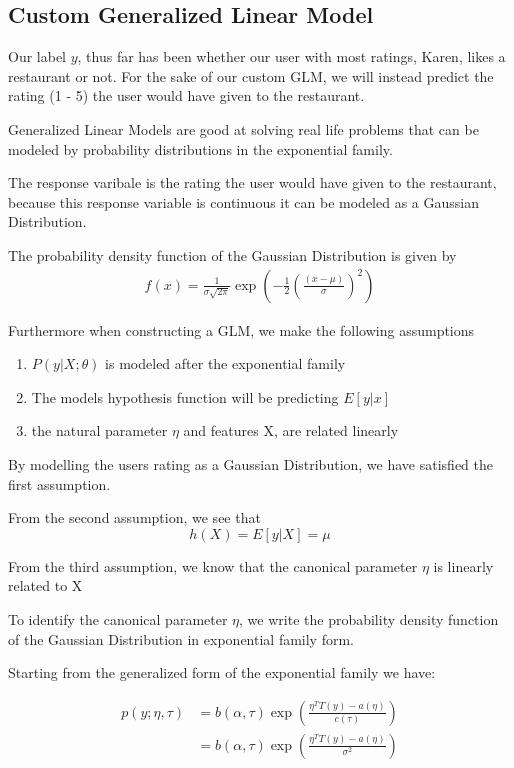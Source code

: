 \documentclass{sigchi}
\begin{document}
\subsection{Custom Generalized Linear Model}
Our label $y$, thus far has been whether our user with most ratings, Karen, likes a restaurant or not. 
For the sake of our custom GLM, we will instead predict the rating (1 - 5) the user would have given to the restaurant.

Generalized Linear Models are good at solving real life problems that can be modeled by probability distributions in the exponential family.

The response varibale is the rating the user would have given to the restaurant, because this response variable is continuous it can be modeled as a Gaussian Distribution.

The probability density function of the Gaussian Distribution is given by
\begin{align*}
  f(x) = \frac{1}{\sigma\sqrt{2\pi}} \exp\left(-\frac{1}{2} \left(\frac{(x - \mu)}{\sigma}\right)^2\right)
\end{align*}

Furthermore when constructing a GLM, we make the following assumptions

\begin{enumerate}
    \item $P(y|X; \theta)$ is modeled after the exponential family
    \item The models hypothesis function will be predicting $E[y|x]$
    \item the natural parameter $\eta$ and features X, are related linearly
\end{enumerate}

By modelling the users rating as a Gaussian Distribution, we have satisfied the first assumption.

From the second assumption, we see that $$h(X) = E[y|X] = \mu$$

From the third assumption, we know that the canonical parameter $\eta$ is linearly related to X

To identify the canonical parameter $\eta$, we write the probability density function of the Gaussian Distribution in exponential family form. 

Starting from the generalized form of the exponential family we have:

\begin{align*}
  p(y; \eta, \tau) &= b(\alpha, \tau) \exp\left(\frac{\eta^T T(y) - a(\eta)}{c(\tau)}\right) \\
  &= b(\alpha, \tau) \exp\left(\frac{\eta^T T(y) - a(\eta)}{\sigma^2}\right) \\
\end{align*}
\end{document}
